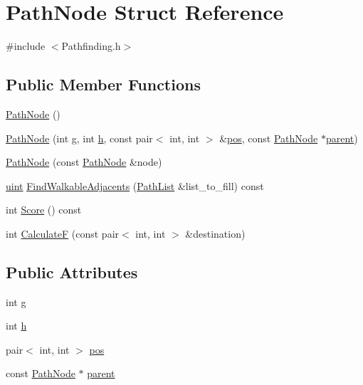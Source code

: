 \hypertarget{struct_path_node}{}\section{Path\+Node Struct Reference}
\label{struct_path_node}


{\ttfamily \#include $<$Pathfinding.\+h$>$}

\subsection*{Public Member Functions}
\begin{DoxyCompactItemize}
\item 
\mbox{\hyperlink{struct_path_node_a8407a02423706e133bfea2b4c872289a}{Path\+Node}} ()
\item 
\mbox{\hyperlink{struct_path_node_af400d4d6c48f5a19aa392ca9a64e6927}{Path\+Node}} (int \mbox{\hyperlink{struct_path_node_a97de9a75f550007643f5df2629d207de}{g}}, int \mbox{\hyperlink{struct_path_node_a87bfefc8a3eac26d0de524bf03a43d31}{h}}, const pair$<$ int, int $>$ \&\mbox{\hyperlink{struct_path_node_a942fdbe2451e6bc1ecd921c7083f7b69}{pos}}, const \mbox{\hyperlink{struct_path_node}{Path\+Node}} $\ast$\mbox{\hyperlink{struct_path_node_a6f659ad1091d0f1dfe18c55114d5f6be}{parent}})
\item 
\mbox{\hyperlink{struct_path_node_af7a498e596d25ff091e493c54f1edf05}{Path\+Node}} (const \mbox{\hyperlink{struct_path_node}{Path\+Node}} \&node)
\item 
\mbox{\hyperlink{_defs_8h_a91ad9478d81a7aaf2593e8d9c3d06a14}{uint}} \mbox{\hyperlink{struct_path_node_ae6a1d0ee4c3bc067ac41478feb367ce2}{Find\+Walkable\+Adjacents}} (\mbox{\hyperlink{struct_path_list}{Path\+List}} \&list\+\_\+to\+\_\+fill) const
\item 
int \mbox{\hyperlink{struct_path_node_ac9ab212cdf4e4fd2fa50143cd94869da}{Score}} () const
\item 
int \mbox{\hyperlink{struct_path_node_ab7dec4b7f3c35b0ea6188884fe6b1859}{CalculateF}} (const pair$<$ int, int $>$ \&destination)
\end{DoxyCompactItemize}
\subsection*{Public Attributes}
\begin{DoxyCompactItemize}
\item 
int \mbox{\hyperlink{struct_path_node_a97de9a75f550007643f5df2629d207de}{g}}
\item 
int \mbox{\hyperlink{struct_path_node_a87bfefc8a3eac26d0de524bf03a43d31}{h}}
\item 
pair$<$ int, int $>$ \mbox{\hyperlink{struct_path_node_a942fdbe2451e6bc1ecd921c7083f7b69}{pos}}
\item 
const \mbox{\hyperlink{struct_path_node}{Path\+Node}} $\ast$ \mbox{\hyperlink{struct_path_node_a6f659ad1091d0f1dfe18c55114d5f6be}{parent}}
\end{DoxyCompactItemize}


